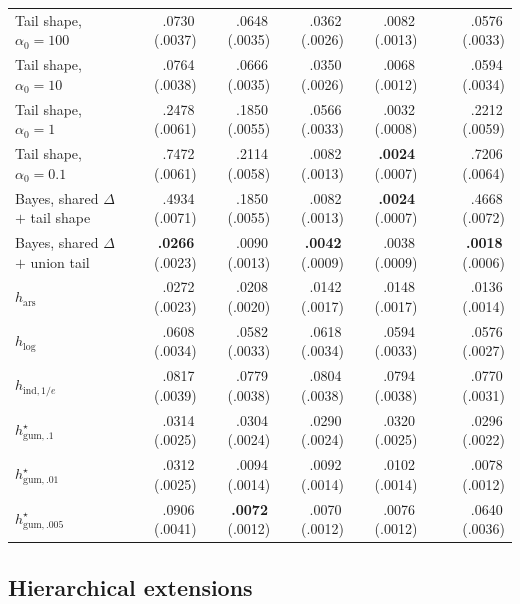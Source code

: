 \documentclass[11pt]{article}
\newcommand{\mcse}[2]{\mbox{#1\,{\fontsize{7}{8}\selectfont(#2)}}}
\newcommand{\bestmcse}[2]{\mbox{\textbf{#1}\,{\fontsize{7}{8}\selectfont(#2)}}}
\begin{document}
\begin{table}[p]
\begin{tabular}{@{}lrrrrcr@{}}
Tail shape, $\alpha_0=100$ & \mcse{.0730}{.0037} & \mcse{.0648}{.0035} & \mcse{.0362}{.0026} & \mcse{.0082}{.0013} & & \mcse{.0576}{.0033} \\
Tail shape, $\alpha_0=10$ & \mcse{.0764}{.0038} & \mcse{.0666}{.0035} & \mcse{.0350}{.0026} & \mcse{.0068}{.0012} & & \mcse{.0594}{.0034} \\
Tail shape, $\alpha_0=1$ & \mcse{.2478}{.0061} & \mcse{.1850}{.0055} & \mcse{.0566}{.0033} & \mcse{.0032}{.0008} & & \mcse{.2212}{.0059} \\
Tail shape, $\alpha_0=0.1$ & \mcse{.7472}{.0061} & \mcse{.2114}{.0058} & \mcse{.0082}{.0013} & \bestmcse{.0024}{.0007} & & \mcse{.7206}{.0064} \\
Bayes, shared $\Delta$ $+$ tail shape & \mcse{.4934}{.0071} & \mcse{.1850}{.0055} & \mcse{.0082}{.0013} & \bestmcse{.0024}{.0007} & & \mcse{.4668}{.0072} \\
Bayes, shared $\Delta$ $+$ union tail & \bestmcse{.0266}{.0023} & \mcse{.0090}{.0013} & \bestmcse{.0042}{.0009} & \mcse{.0038}{.0009} & & \bestmcse{.0018}{.0006} \\
\addlinespace[1pt]
$h_{\mathrm{ars}}$ & \mcse{.0272}{.0023} & \mcse{.0208}{.0020} & \mcse{.0142}{.0017} & \mcse{.0148}{.0017} & & \mcse{.0136}{.0014} \\
$h_{\log}$ & \mcse{.0608}{.0034} & \mcse{.0582}{.0033} & \mcse{.0618}{.0034} & \mcse{.0594}{.0033} & & \mcse{.0576}{.0027} \\
$h_{\mathrm{ind},1/e}$ & \mcse{.0817}{.0039} & \mcse{.0779}{.0038} & \mcse{.0804}{.0038} & \mcse{.0794}{.0038} & & \mcse{.0770}{.0031} \\
$h^\star_{\mathrm{gum},.1}$ & \mcse{.0314}{.0025} & \mcse{.0304}{.0024} & \mcse{.0290}{.0024} & \mcse{.0320}{.0025} & & \mcse{.0296}{.0022} \\
$h^\star_{\mathrm{gum},.01}$ & \mcse{.0312}{.0025} & \mcse{.0094}{.0014} & \mcse{.0092}{.0014} & \mcse{.0102}{.0014} & & \mcse{.0078}{.0012} \\
$h^\star_{\mathrm{gum},.005}$ & \mcse{.0906}{.0041} & \bestmcse{.0072}{.0012} & \mcse{.0070}{.0012} & \mcse{.0076}{.0012} & & \mcse{.0640}{.0036} \\
\bottomrule
\end{tabular}
\end{table}


\FloatBarrier
\subsection{Hierarchical extensions}
\label{sec:hierarchical-summary}
\end{document}
